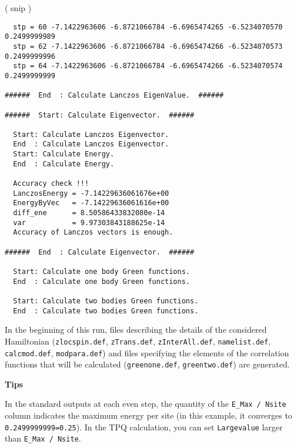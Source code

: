 \normalsize
( snip )
\small
\begin{verbatim}
  stp = 60 -7.1422963606 -6.8721066784 -6.6965474265 -6.5234070570 0.2499999989 
  stp = 62 -7.1422963606 -6.8721066784 -6.6965474266 -6.5234070573 0.2499999996 
  stp = 64 -7.1422963606 -6.8721066784 -6.6965474266 -6.5234070574 0.2499999999 

######  End  : Calculate Lanczos EigenValue.  ######

######  Start: Calculate Eigenvector.  ######

  Start: Calculate Lanczos Eigenvector.
  End  : Calculate Lanczos Eigenvector.
  Start: Calculate Energy.
  End  : Calculate Energy.

  Accuracy check !!!
  LanczosEnergy = -7.14229636061676e+00 
  EnergyByVec   = -7.14229636061616e+00 
  diff_ene      = 8.50586433832080e-14 
  var           = 9.97303843188625e-14 
  Accuracy of Lanczos vectors is enough.

######  End  : Calculate Eigenvector.  ######

  Start: Calculate one body Green functions.
  End  : Calculate one body Green functions.

  Start: Calculate two bodies Green functions.
  End  : Calculate two bodies Green functions.
\end{verbatim}
\normalsize

In the beginning of this run,
files describing the details of the considered Hamiltonian 
(\verb|zlocspin.def|, \verb|zTrans.def|, \verb|zInterAll.def|, 
\verb|namelist.def|, \verb|calcmod.def|, \verb|modpara.def|)
and files specifying the elements of the correlation functions
that will be calculated
(\verb|greenone.def|, \verb|greentwo.def|)
are generated.

\begin{screen}
\Large 
{\bf Tips}
\normalsize

In the standard outputs at each even step, 
the quantity of the \verb|E_Max / Nsite| column indicates 
the maximum energy per site
(in this example, it converges to \verb|0.2499999999=0.25|).
In the TPQ calculation, you can set \verb|Largevalue| %
larger than \verb|E_Max / Nsite|.

\end{screen}

